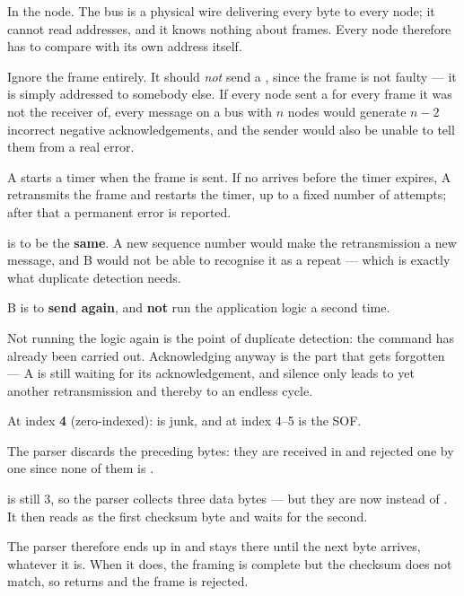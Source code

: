  In the node. The bus is a physical wire delivering every byte to every node; it cannot
read addresses, and it knows nothing about frames. Every node therefore has to compare 
with its own address itself.

 Ignore the frame entirely. It should \emph{not} send a , since the frame is not
faulty --- it is simply addressed to somebody else. If every node sent a  for every
frame it was not the receiver of, every message on a bus with $n$ nodes would generate $n-2$
incorrect negative acknowledgements, and the sender would also be unable to tell them from a real
error.

 A starts a timer when the frame is sent. If no  arrives before the timer expires,
A retransmits the frame and restarts the timer, up to a fixed number of attempts; after that a
permanent error is reported.

 is to be the \textbf{same}. A new sequence number would make the retransmission a new
message, and B would not be able to recognise it as a repeat --- which is exactly what duplicate
detection needs.

 B is to \textbf{send  again}, and \textbf{not} run the application logic a
second time.

Not running the logic again is the point of duplicate detection: the command has already been
carried out. Acknowledging anyway is the part that gets forgotten --- A is still waiting for its
acknowledgement, and silence only leads to yet another retransmission and thereby to an endless
cycle.

 At index \textbf{4} (zero-indexed):  is junk, and  at index
4--5 is the SOF.

The parser discards the preceding bytes: they are received in  and rejected one
by one since none of them is .

  is still 3, so the parser collects three data bytes --- but they are now
 instead of . It then reads  as the first checksum byte and
waits for the second.

The parser therefore ends up in  and stays there until the next byte arrives,
whatever it is. When it does, the framing is complete but the checksum does not match, so
 returns  and the frame is rejected.

